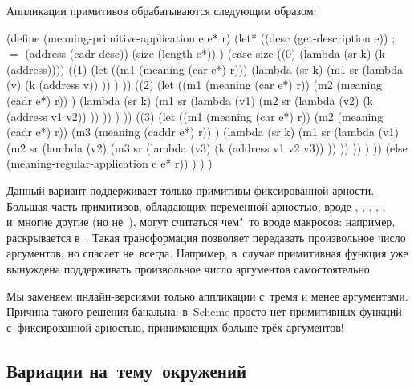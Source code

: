 Аппликации примитивов обрабатываются следующим образом:

\begin{code:lisp}
(define (meaning-primitive-application e e* r)
  (let* ((desc (get-description e)) ; ${}={}$
         (address (cadr desc))
         (size (length e*)) )
    (case size
     ((0) (lambda (sr k) (k (address))))
     ((1) (let ((m1 (meaning (car e*) r)))
            (lambda (sr k)
              (m1 sr (lambda (v)
                       (k (address v)) )) ) ))
     ((2) (let ((m1 (meaning (car e*) r))
                (m2 (meaning (cadr e*) r)) )
            (lambda (sr k)
              (m1 sr (lambda (v1)
                (m2 sr (lambda (v2)
                         (k (address v1 v2)) )) )) ) ))
     ((3) (let ((m1 (meaning (car e*) r))
                (m2 (meaning (cadr e*) r))
                (m3 (meaning (caddr e*) r)) )
            (lambda (sr k)
              (m1 sr (lambda (v1)
                (m2 sr (lambda (v2)
                  (m3 sr (lambda (v3)
                           (k (address v1 v2 v3)) )) )) )) ) ))
     (else (meaning-regular-application e e* r)) ) ) )
\end{code:lisp}

Данный вариант поддерживает только примитивы фиксированной арности. Большая
часть примитивов, обладающих переменной арностью, вроде ,
, , , \ic{*}, \ic{+} и~многие другие (но
не~), могут считаться чем"~то вроде макросов: например,  раскрывается в~. Такая трансформация позволяет передавать произвольное число
аргументов, но спасает не~всегда. Например, в~случае 
примитивная функция  уже вынуждена поддерживать произвольное число
аргументов самостоятельно.

Мы заменяем инлайн-версиями только аппликации с~тремя и менее аргументами.
Причина такого решения банальна: в~Scheme просто нет примитивных функций
с~фиксированной арностью, принимающих больше трёх аргументов!


\subsection{Вариации на~тему~окружений}\label{fast/fast/ssect:variations}


